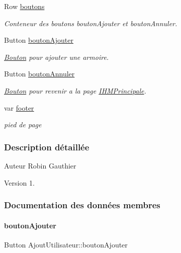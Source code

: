 \begin{DoxyCompactItemize}
Row \hyperlink{class_ajout_utilisateur_a95525d6d8ddabe17450678208923803e}{boutons}
\begin{DoxyCompactList}\small\item\em Conteneur des boutons bouton\+Ajouter et bouton\+Annuler. \end{DoxyCompactList}\item 
Button \hyperlink{class_ajout_utilisateur_afe2cf8adda0bdbe1953f2edc10f07e3f}{bouton\+Ajouter}
\begin{DoxyCompactList}\small\item\em \hyperlink{class_bouton}{Bouton} pour ajouter une armoire. \end{DoxyCompactList}\item 
Button \hyperlink{class_ajout_utilisateur_afca64f6638a46ba593b07871421f5627}{bouton\+Annuler}
\begin{DoxyCompactList}\small\item\em \hyperlink{class_bouton}{Bouton} pour revenir a la page \hyperlink{class_i_h_m_principale}{I\+H\+M\+Principale}. \end{DoxyCompactList}\item 
var \hyperlink{class_ajout_utilisateur_ac792c990efef9229755690f5fbe30939}{footer}
\begin{DoxyCompactList}\small\item\em pied de page \end{DoxyCompactList}\end{DoxyCompactItemize}


\subsubsection{Description détaillée}
\begin{DoxyAuthor}{Auteur}
Robin Gauthier
\end{DoxyAuthor}
\begin{DoxyVersion}{Version}
1. 
\end{DoxyVersion}


\subsubsection{Documentation des données membres}
\mbox{\label{class_ajout_utilisateur_afe2cf8adda0bdbe1953f2edc10f07e3f}} 
\paragraph{\texorpdfstring{bouton\+Ajouter}{boutonAjouter}}
{\footnotesize\ttfamily Button Ajout\+Utilisateur\+::bouton\+Ajouter\hspace{0.3cm}{\ttfamily [private]}}

